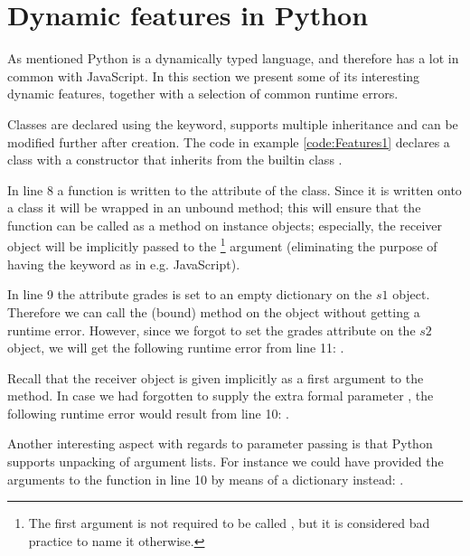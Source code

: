 \chapter{Dynamic features in Python}
\label{Features}
As mentioned Python is a dynamically typed language, and therefore has a lot in common with JavaScript. In this section we present some of its interesting dynamic features, together with a selection of common runtime errors.

Classes are declared using the  keyword, supports multiple inheritance and can be modified further after creation. 
The code in example \ref{code:Features1} declares a class  with a constructor that inherits from the builtin class .

In line 8 a function  is written to the  attribute of the  class. Since it is written onto a class it will be wrapped in an unbound method; this will ensure that the function can be called as a method on instance objects; especially, the receiver object will be implicitly passed to the \footnote{The first argument is not required to be called , but it is considered bad practice to name it otherwise.} argument (eliminating the purpose of having the  keyword as in e.g. JavaScript).

In line 9 the attribute grades is set to an empty dictionary on the $s1$ object. Therefore we can call the (bound) method  on the  object without getting a runtime error. However, since we forgot to set the grades attribute on the $s2$ object, we will get the following runtime error from line 11: . 

Recall that the receiver object is given implicitly as a first argument to the  method. 
In case we had forgotten to supply the extra formal parameter , the following runtime error would result from line 10:
. 

Another interesting aspect with regards to parameter passing is that Python supports unpacking of argument lists. For instance we could have provided the arguments to the  function in line 10 by means of a dictionary instead: 
.

